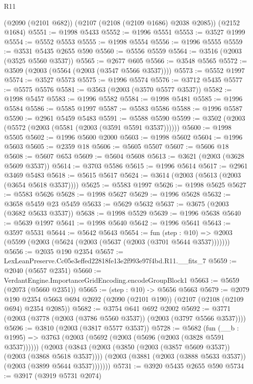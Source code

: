 \begin{lexlean}{R11}
\begin{coremodule}
    (@2090 (@2101 @682))
    (@2107 (@2108 (@2109 @1686) @2038 @2085))
    (@2152 @1684)
@5551 := @1998 @5433
@5552 := @1996 @5551
@5553 := @3527 @1999
@5554 := @5552 @5553
@5555 := @1998 @5554
@5556 := @1996 @5555
@5559 := @3531 @5435 @2655 @590
@5560 := @5556 @5559
@5564 := @3516 (@2003 (@3525 @5560 @3537))
@5565 := @2677 @605
@5566 := @3548 @5565
@5572 := @3509 (@2003 (@5564 (@2003 (@3547 @5566 @3537))))
@5573 := @5552 @1997
@5574 := @3527 @5573
@5575 := @1996 @5574
@5576 := @3712 @5435
@5577 := @5575 @5576
@5581 := @3563 (@2003 (@3570 @5577 @3537))
@5582 := @1998 @5457
@5583 := @1996 @5582
@5584 := @1998 @5481
@5585 := @1996 @5584
@5586 := @5585 @1997
@5587 := @5583 @5586
@5588 := @1996 @5587
@5590 := @2961 @5459 @5483
@5591 := @5588 @5590
@5599 := @3502 (@2003 (@5572 (@2003 (@5581 (@2003 (@3591 @5591 @3537))))))
@5600 := @1998 @5505
@5602 := @1996 @5600 @2000
@5603 := @1998 @5602
@5604 := @1996 @5603
@5605 := @2359 @18
@5606 := @5605 @5507
@5607 := @5606 @18
@5608 := @5607 @653
@5609 := @5604 @5608
@5613 := @3621 (@2003 (@3628 @5609 @3537))
@5614 := @3703 @5586
@5615 := @1996 @5614
@5617 := @2961 @3469 @5483
@5618 := @5615 @5617
@5624 := @3614 (@2003 (@5613 (@2003 (@3654 @5618 @3537))))
@5625 := @5583 @1997
@5626 := @1998 @5625
@5627 := @5583 @5626
@5628 := @1998 @5627
@5629 := @1996 @5628
@5632 := @3658 @5459 @23 @5459
@5633 := @5629 @5632
@5637 := @3675 (@2003 (@3682 @5633 @3537))
@5638 := @1998 @5529
@5639 := @1996 @5638
@5640 := @5639 @1997
@5641 := @1998 @5640
@5642 := @1996 @5641
@5643 := @3597 @5531
@5644 := @5642 @5643
@5654 := fun (step : @10) =>
  @2003 (@5599 (@2003 (@5624 (@2003 (@5637 (@2003 (@3701 @5644 @3537)))))))
@5656 := @2035 @190 @2354
@5657 := LexLeanPreserve.Cc05e3effed22818fe13e2f993e97f4bd.R11.__fits_7
@5659 := @2040 (@5657 @2351)
@5660 := VerdantEngine.ImportanceGridEncoding.encodeGroupBlock1
@5663 := @5659 (@2073 (@5660 @2351))
@5665 := (step : @10) -> @5656 @5663
@5679 := @2079
    @190
    @2354
    @5663
    @694
    @2692
    (@2090 (@2101 @190))
    (@2107 (@2108 (@2109 @694) @2354 @2085))
@5682 := @3754 @641 @692 @2002
@5692 := @3771 (@2003 (@3778 (@2003 (@3786 @5560 @3537)) (@2003 (@3797 @5566 @3537))))
@5696 := @3810 (@2003 (@3817 @5577 @3537))
@5728 := @5682
    (fun (__b : @1995) =>
    @3763
      (@2003 (@5692 (@2003 (@5696 (@2003 (@3828 @5591 @3537))))))
      (@2003
        (@3843
          (@2003 (@3850 (@2003 (@3857 @5609 @3537)) (@2003 (@3868 @5618 @3537))))
          (@2003 (@3881 (@2003 (@3888 @5633 @3537)) (@2003 (@3899 @5644 @3537)))))))
@5731 := @3920 @5435 @2655 @590
@5734 := @3917 (@3919 @5731 @2074)

\end{coremodule}
\end{lexlean}
